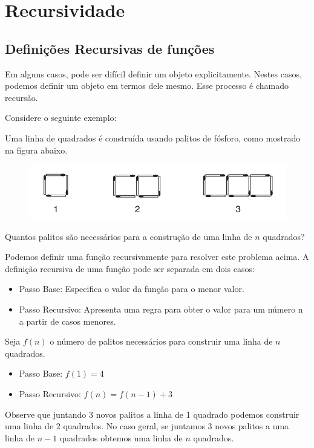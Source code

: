 \chapter{Recursividade}

\section{Definições Recursivas de funções}

Em alguns casos, pode ser difícil definir um objeto explicitamente. Nestes casos, podemos definir um objeto em termos dele mesmo. Esse processo é chamado recursão.


Considere o seguinte exemplo: 

\begin{exemplo}
Uma linha de quadrados é construída usando palitos de fósforo, como mostrado na figura abaixo.


\begin{figure}[htbp]
\centering
\includegraphics[width=.9\textwidth]{images/fosforos.png}
\label{fig:exampleFig2}
\end{figure}

Quantos palitos são necessários para a construção de uma linha de $n$ quadrados? 

Podemos definir uma função recursivamente para resolver este problema acima. A definição recursiva de uma função pode ser separada em dois casos:

\begin{itemize}
    \item Passo Base: Especifica o valor da função para o menor valor.
    \item Passo Recursivo: Apresenta uma regra para obter o valor para um número n a partir de casos menores.
\end{itemize}

Seja $f(n)$ o número de palitos necessários para construir uma linha de $n$ quadrados.

\begin{itemize}
    \item Passo Base: $f(1) = 4$
    \item Passo Recursivo: $f(n) = f(n-1) + 3$
\end{itemize}

Observe que juntando 3 novos palitos a linha de 1 quadrado podemos construir uma linha de 2 quadrados. No caso geral, se juntamos 3 novos palitos a uma linha de $n-1$ quadrados obtemos uma linha de $n$ quadrados.
\end{exemplo}


